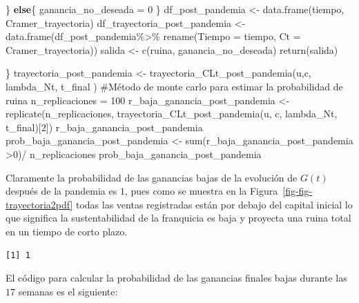 \documentclass[
  us-letterpaper,
]{scrreprt}
\newenvironment{Shaded}{\begin{snugshade}}{\end{snugshade}}
\newcommand{\AttributeTok}[1]{\textcolor[rgb]{0.40,0.45,0.13}{#1}}
\newcommand{\CommentTok}[1]{\textcolor[rgb]{0.37,0.37,0.37}{#1}}
\newcommand{\ControlFlowTok}[1]{\textcolor[rgb]{0.00,0.23,0.31}{\textbf{#1}}}
\newcommand{\DecValTok}[1]{\textcolor[rgb]{0.68,0.00,0.00}{#1}}
\newcommand{\FunctionTok}[1]{\textcolor[rgb]{0.28,0.35,0.67}{#1}}
\newcommand{\NormalTok}[1]{\textcolor[rgb]{0.00,0.23,0.31}{#1}}
\newcommand{\OtherTok}[1]{\textcolor[rgb]{0.00,0.23,0.31}{#1}}
\newcommand{\SpecialCharTok}[1]{\textcolor[rgb]{0.37,0.37,0.37}{#1}}
\theoremstyle{plain}
\theoremstyle{plain}
\theoremstyle{definition}
\theoremstyle{remark}
\begin{document}
\begin{Shaded}
\begin{Highlighting}[]
\NormalTok{  \} }
  \ControlFlowTok{else}\NormalTok{\{}
\NormalTok{    ganancia\_no\_deseada }\OtherTok{=} \DecValTok{0}
\NormalTok{  \}}
\NormalTok{  df\_post\_pandemia }\OtherTok{\textless{}{-}} \FunctionTok{data.frame}\NormalTok{(tiempo, Cramer\_trayectoria)}
\NormalTok{  df\_trayectoria\_post\_pandemia }\OtherTok{\textless{}{-}} \FunctionTok{data.frame}\NormalTok{(df\_post\_pandemia}\SpecialCharTok{\%\textgreater{}\%} 
                                  \FunctionTok{rename}\NormalTok{(}\AttributeTok{Tiempo =}\NormalTok{ tiempo,}
                                         \AttributeTok{Ct =}\NormalTok{ Cramer\_trayectoria))}
\NormalTok{  salida }\OtherTok{\textless{}{-}} \FunctionTok{c}\NormalTok{(ruina, ganancia\_no\_deseada)}
  \FunctionTok{return}\NormalTok{(salida)}
  
\NormalTok{\}}
\NormalTok{trayectoria\_post\_pandemia }\OtherTok{\textless{}{-}} \FunctionTok{trayectoria\_CLt\_post\_pandemia}\NormalTok{(u,c,}
\NormalTok{                                            lambda\_Nt, t\_final )}
\CommentTok{\#Método de monte carlo para estimar la probabilidad de ruina}
\NormalTok{n\_replicaciones }\OtherTok{=} \DecValTok{100}
\NormalTok{r\_baja\_ganancia\_post\_pandemia }\OtherTok{\textless{}{-}} \FunctionTok{replicate}\NormalTok{(n\_replicaciones,}
                          \FunctionTok{trayectoria\_CLt\_post\_pandemia}\NormalTok{(u, c, }
\NormalTok{                                         lambda\_Nt, t\_final)[}\DecValTok{2}\NormalTok{])}
\NormalTok{r\_baja\_ganancia\_post\_pandemia }
\NormalTok{prob\_baja\_ganancia\_post\_pandemia }\OtherTok{\textless{}{-}} \FunctionTok{sum}\NormalTok{(r\_baja\_ganancia\_post\_pandemia }\SpecialCharTok{\textgreater{}}\DecValTok{0}\NormalTok{)}\SpecialCharTok{/}
\NormalTok{n\_replicaciones}
\NormalTok{prob\_baja\_ganancia\_post\_pandemia}
\end{Highlighting}
\end{Shaded}

Claramente la probabilidad de las ganancias bajas de la evolución de
\(G(t)\) después de la pandemia es \(1\), pues como se muestra en la
Figura~\ref{fig-fig-trayectoria2pdf} todas las ventas registradas están
por debajo del capital inicial lo que significa la sustentabilidad de la
franquicia es baja y proyecta una ruina total en un tiempo de corto
plazo.

\begin{verbatim}
[1] 1
\end{verbatim}

El código para calcular la probabilidad de las ganancias finales bajas
durante las \(17\) semanas es el siguiente:
\end{document}
